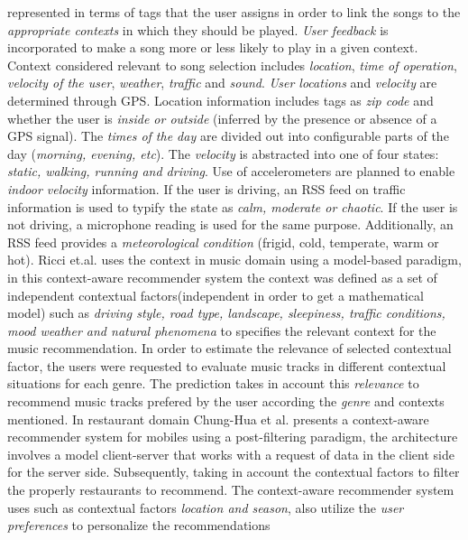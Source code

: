 represented in terms of tags that the user assigns in order to link
the songs to the \textit{appropriate contexts} in which they should be played.
\textit{User feedback} is incorporated to make a song more or less likely to
play in a given context. Context considered relevant to song selection
includes \textit{location}, \textit{time of operation}, \textit{velocity of the user}, 
\textit{weather}, \textit{traffic} and \textit{sound}. \textit{User locations} and 
\textit{velocity} are determined through GPS.
Location information includes tags as \textit{zip code} and whether the
user is \textit{inside or outside} (inferred by the presence or absence of a
GPS signal). The \textit{times of the day} are divided out into configurable
parts of the day (\textit{morning, evening, etc}). The \textit{velocity} is 
abstracted into one of four states: \textit{static, walking, running and driving}.  
Use of accelerometers are planned to enable \textit{indoor velocity}
 information. If the user is driving, an RSS feed on traffic information 
 is used to typify the state as \textit{calm, moderate or chaotic}. If the user is not
driving, a microphone reading is used for the same purpose.
Additionally, an RSS feed provides a \textit{meteorological condition} (frigid,
cold, temperate, warm or hot).
Ricci et.al. \cite{baltrunas2011incarmusic} uses
the context in music domain using a model-based paradigm, in this
context-aware recommender system the context was defined as a set of
independent contextual factors(independent in order to get a
mathematical model) such as \textit{driving style, road type,
landscape, sleepiness, traffic conditions, mood weather and natural
phenomena} to specifies the relevant context for the music
recommendation. In order to estimate the relevance of selected
contextual factor, the users were requested to evaluate music tracks
in different contextual situations for each genre. The prediction
takes in account this \textit{relevance} to recommend music tracks 
prefered by the user according the \textit{genre} and contexts mentioned.
In restaurant domain Chung-Hua et al.\cite{chu2013chinese} presents a
context-aware recommender system for mobiles using a post-filtering
paradigm, the architecture involves a model client-server that works
with a request of data in the client side for the server side.
Subsequently, taking in account the contextual factors to filter the
properly restaurants to recommend. The context-aware recommender
system uses such as contextual factors \textit{location and season}, 
also utilize the \textit{user preferences} to personalize the recommendations
